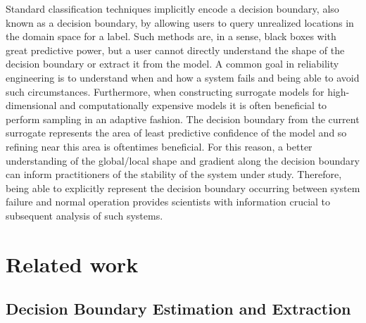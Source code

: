 \documentclass[12pt]{article}
\begin{document}
Standard classification techniques implicitly encode a decision boundary, also
known as a decision boundary, by allowing users to query unrealized locations in
the domain space for a label.
%
Such methods are, in a sense, black boxes with great predictive power, but a
user cannot directly understand the shape of the decision boundary or extract
it from the model.
%
A common goal in reliability engineering is to understand when and how a system
fails and being able to avoid such circumstances.
%
Furthermore, when constructing surrogate models for high-dimensional and
computationally expensive models it is often beneficial to perform sampling in
an adaptive fashion.
%
The decision boundary from the current surrogate represents the area of least
predictive confidence of the model and so refining near this area is oftentimes
beneficial.
%
For this reason, a better understanding of the global/local shape and gradient
along the decision boundary can inform practitioners of the stability of the
system under study.
%
Therefore, being able to explicitly represent the decision boundary occurring
between system failure and normal operation provides scientists with information
crucial to subsequent analysis of such systems.

\section{Related work}

\subsection{Decision Boundary Estimation and Extraction}
\end{document}
